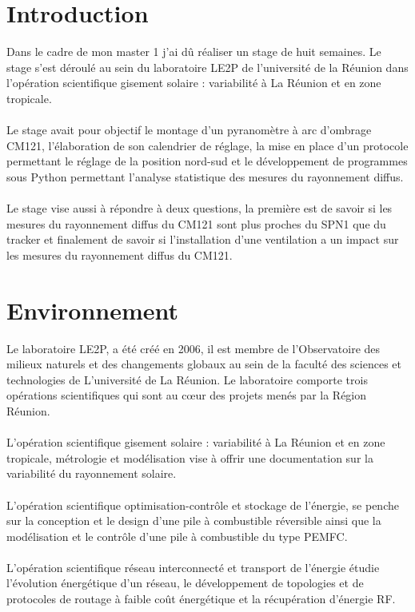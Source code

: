 \documentclass[12pt,a4paper]{article}
\begin{document}
\begin{flushleft}

\justify
\sf
\section{Introduction}

\setcounter{page}{1}

Dans le cadre de mon master 1 j'ai dû réaliser un stage de huit semaines. Le stage s'est déroulé au sein du laboratoire LE2P de l'université de la Réunion dans l'opération scientifique gisement solaire : variabilité à La Réunion et en zone tropicale.\\
~\\
Le stage avait pour objectif le montage d'un pyranomètre à arc d'ombrage CM121, l'élaboration de son calendrier de réglage, la mise en place d'un protocole permettant le réglage de la position nord-sud et le développement de programmes sous Python permettant l'analyse statistique des mesures du rayonnement diffus.\\
~\\
 Le stage vise aussi à répondre à deux questions, la première est de savoir si les mesures du rayonnement diffus du CM121 sont plus proches  du SPN1 que du tracker et finalement de savoir si l'installation d'une ventilation a un impact sur les mesures du rayonnement diffus du CM121.
 

\section{Environnement}



Le laboratoire LE2P, a été créé en 2006,  il est membre de l’Observatoire des milieux naturels et des changements globaux au sein de la faculté des sciences et technologies de L’université de La Réunion. Le laboratoire comporte trois opérations scientifiques qui sont au cœur des projets menés par la Région Réunion.\\
~\\
L'opération scientifique gisement solaire : variabilité à La Réunion et en zone tropicale, métrologie et modélisation  vise à offrir une documentation sur la variabilité du rayonnement solaire.\\
~\\
L'opération scientifique optimisation-contrôle et stockage de l'énergie, se penche sur la conception et le design d’une pile à combustible réversible ainsi que la modélisation et le contrôle d’une pile à combustible du type PEMFC.\\ 
~\\
L'opération scientifique réseau interconnecté et transport de l'énergie étudie l’évolution énergétique d'un réseau, le développement de topologies et de protocoles de routage à faible coût énergétique et la récupération d’énergie RF.
~\\



\end{flushleft}
\end{document}
